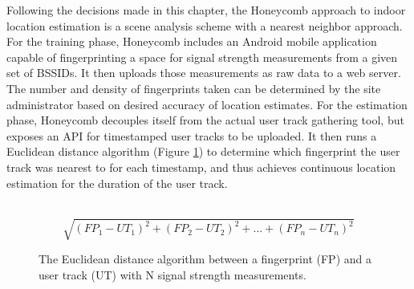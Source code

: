 Following the decisions made in this chapter, the Honeycomb approach to indoor location estimation is a scene analysis scheme with a nearest neighbor approach. For the training phase, Honeycomb includes an Android mobile application capable of fingerprinting a space for signal strength measurements from a given set of BSSIDs. It then uploads those measurements as raw data to a web server. The number and density of fingerprints taken can be determined by the site administrator based on desired accuracy of location estimates. For the estimation phase, Honeycomb decouples itself from the actual user track gathering tool, but exposes an API for timestamped user tracks to be uploaded. It then runs a Euclidean distance algorithm (Figure \ref{euclideandistance}) to determine which fingerprint the user track was nearest to for each timestamp, and thus achieves continuous location estimation for the duration of the user track. 

\begin{figure}[htb] %
	\begin{center}
		\ \[ \sqrt{(FP_{1} - UT_{1})^2 + (FP_{2} - UT_{2})^2 + ... + (FP_{n} - UT_{n})^2} \]
		\caption{The Euclidean distance algorithm between a fingerprint (FP) and a user track (UT) with N signal strength measurements.}
		\label{euclideandistance}
	\end{center}
\end{figure}